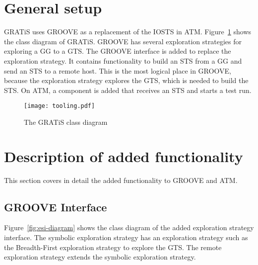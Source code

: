 \section{General setup}\label{sec:general-setup}
GRATiS uses GROOVE as a replacement of the IOSTS in ATM. Figure~\ref{fig:class_diagram} shows the class diagram of GRATiS. GROOVE has several exploration strategies for exploring a GG to a GTS. The GROOVE interface is added to replace the exploration strategy. It contains functionality to build an STS from a GG and send an STS to a remote host. This is the most logical place in GROOVE, because the exploration strategy explores the GTS, which is needed to build the STS. On ATM, a component is added that receives an STS and starts a test run.

\begin{figure}[ht]
  \begin{center}
    \texttt{[image: tooling.pdf]}
  \end{center}
  \caption{The GRATiS class diagram}
  \label{fig:class_diagram}
\end{figure}

\begin{comment}
Figure~\ref{fig:collaboration_diagram} shows the collaboration diagram of GRATiS. The user uses the interface of GROOVE to input a graph grammar. Then the user inputs a remote host and  'a' is the start of a new collaboration chain, representing the normal flow of ATM as depicted in Figure~\ref{fig:axini_tool}.

\begin{figure}[ht]
  \begin{center}
    \texttt{[image: tooling.pdf]}
  \end{center}
  \caption{The GRATiS design: replacing the STS with GROOVE}
  \label{fig:collaboration_diagram}
\end{figure}
\end{comment}

\section{Description of added functionality}
This section covers in detail the added functionality to GROOVE and ATM. 

\subsection{GROOVE Interface}
Figure~\ref{fig:esi-diagram} shows the class diagram of the added exploration strategy interface. The symbolic exploration strategy has an exploration strategy such as the Breadth-First exploration strategy to explore the GTS. The remote exploration strategy extends the symbolic exploration strategy.

